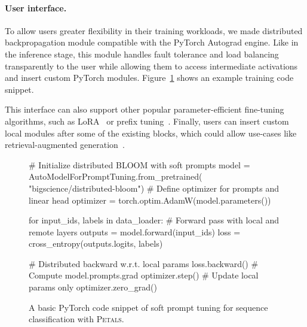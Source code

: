 \paragraph{User interface.} To allow users greater flexibility in their training workloads, we made distributed backpropagation module compatible with the PyTorch Autograd engine. Like in the inference stage, this module handles fault tolerance and load balancing transparently to the user while allowing them to access intermediate activations and insert custom PyTorch modules. Figure~\ref{fig:training_snippet} shows an example training code snippet.

This interface can also support other popular parameter-efficient fine-tuning algorithms, such as LoRA~\cite{hu2021lora} or prefix tuning~\cite{li-liang-2021-prefix}. Finally, users can insert custom local modules after some of the  existing blocks, which could allow use-cases like retrieval-augmented generation~\cite{retro,rag}.%

\begin{figure}[tb]
\small
\begin{pythoncode}
# Initialize distributed BLOOM with soft prompts
model = AutoModelForPromptTuning.from_pretrained(
       "bigscience/distributed-bloom")
# Define optimizer for prompts and linear head
optimizer = torch.optim.AdamW(model.parameters())

for input_ids, labels in data_loader:
    # Forward pass with local and remote layers
    outputs = model.forward(input_ids)
    loss = cross_entropy(outputs.logits, labels)

    # Distributed backward w.r.t. local params
    loss.backward() # Compute model.prompts.grad
    optimizer.step() # Update local params only
    optimizer.zero_grad()
\end{pythoncode}
\vspace{-4mm}
\caption{A basic PyTorch code snippet of soft prompt tuning for sequence classification with \textsc{Petals}.}
\label{fig:training_snippet}
\vspace{-5pt}
\end{figure}




